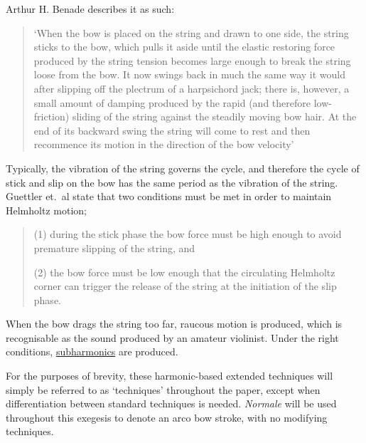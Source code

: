Arthur H. Benade describes it as such: 
\begin{quotation}
  `When the bow is placed on the string and drawn to one side, the string sticks to the bow, which pulls it aside until the elastic restoring force produced by the string tension becomes large enough to break the string loose from the bow.
  It now swings back in much the same way it would after slipping off the plectrum of a harpsichord jack; there is, however, a small amount of damping produced by the rapid (and therefore low-friction) sliding of the string against the steadily moving bow hair.
  At the end of its backward swing the string will come to rest and then recommence its motion in the direction of the bow velocity'\autocite[516]{benadeFundamentalsMusicalAcoustics1990}
\end{quotation}
Typically, the vibration of the string governs the cycle, and therefore the cycle of stick and slip on the bow has the same period as the vibration of the string.\autocite[]{wolfeBowsStrings2006}
Guettler et.\ al state that two conditions must be met in order to maintain Helmholtz motion;
\begin{quotation}
  (1) during the stick phase the bow force must be high enough to avoid premature slipping of the string, and 

  (2) the bow force must be low enough that the circulating Helmholtz corner can trigger the release of the string at the initiation of the slip phase.
\end{quotation}

When the bow drags the string too far, raucous motion is produced, which is recognisable as the sound produced by an amateur violinist.
Under the right conditions, \hyperref[sec:subharmonics]{subharmonics} are produced.

For the purposes of brevity, these harmonic-based extended techniques will simply be referred to as `techniques' throughout the paper, except when differentiation between standard techniques is needed.
\emph{Normale} will be used throughout this exegesis to denote an arco bow stroke, with no modifying techniques.

